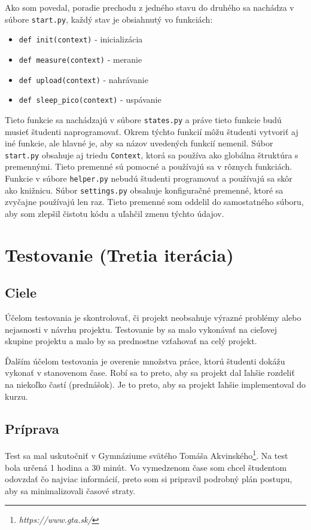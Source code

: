 Ako som povedal, poradie prechodu z jedného stavu do druhého sa nachádza v súbore \verb|start.py|, každý stav je obsiahnutý vo funkciách:
\begin{itemize}
    \item \verb|def init(context)| - inicializácia
    \item \verb|def measure(context)| - meranie
    \item \verb|def upload(context)| - nahrávanie
    \item \verb|def sleep_pico(context)| - uspávanie
\end{itemize}
Tieto funkcie sa nachádzajú v súbore \verb|states.py| a práve tieto funkcie budú musieť študenti naprogramovať. Okrem týchto funkcií môžu študenti vytvoriť aj iné funkcie, ale hlavné je, aby sa názov uvedených funkcií nemenil. Súbor \verb|start.py| obsahuje aj triedu \verb|Context|, ktorá sa používa ako globálna štruktúra s premennými. Tieto premenné sú pomocné a používajú sa v rôznych funkciách. Funkcie v súbore \verb|helper.py| nebudú študenti programovať a používajú sa skôr ako knižnicu. Súbor \verb|settings.py| obsahuje konfiguračné premenné, ktoré sa zvyčajne používajú len raz. Tieto premenné som oddelil do samostatného súboru, aby som zlepšil čistotu kódu a uľahčil zmenu týchto údajov.

\section{Testovanie (Tretia iterácia)}
\subsection{Ciele}
Účelom testovania je skontrolovať, či projekt neobsahuje výrazné problémy alebo nejasnosti v návrhu projektu. Testovanie by sa malo vykonávať na cieľovej skupine projektu a malo by sa prednostne vzťahovať na celý projekt.

Ďalším účelom testovania je overenie množstva práce, ktorú študenti dokážu vykonať v stanovenom čase. Robí sa to preto, aby sa projekt dal ľahšie rozdeliť na niekoľko častí (prednášok). Je to preto, aby sa projekt ľahšie implementoval do kurzu.
\subsection{Príprava}
Test sa mal uskutočniť v Gymnáziume svätého Tomáša Akvinského\footnote{\textit{https://www.gta.sk/}}. Na test bola určená 1 hodina a 30 minút. Vo vymedzenom čase som chcel študentom odovzdať čo najviac informácií, preto som si pripravil podrobný plán postupu, aby sa minimalizovali časové straty.

